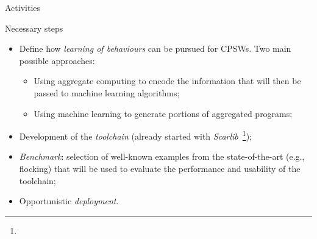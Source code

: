 \documentclass[presentation]{beamer}\mode<presentation>{\usetheme{AMSBolognaFC}}
\begin{document}
\begin{frame}[c]{Activities}

\begin{block}{Necessary steps}
	\begin{itemize}
		\item Define how \emph{learning of behaviours} can be pursued for CPSWs. 
			Two main possible approaches:
			\begin{itemize}
				\item Using aggregate computing to encode the information that will then be 
					passed to machine learning algorithms;
				\item Using machine learning to generate portions of aggregated programs;
			\end{itemize}
		\item Development of the \emph{toolchain} (already started with \emph{Scarlib}~\footnote{});
		\item \emph{Benchmark}: selection of well-known examples from the state-of-the-art (e.g., flocking) 
			that will be used to evaluate the performance and usability of the toolchain;
		\item Opportunistic \emph{deployment}.
	\end{itemize}
\end{block}
	
\end{frame}


\end{document}
